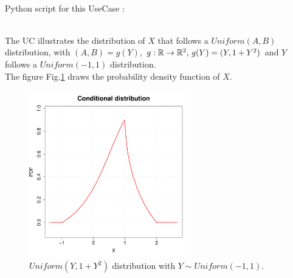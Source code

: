 \textspace\\
Python script for this UseCase :


\textspace\\

The UC illustrates the distribution of  $X$ that follows a $Uniform(A,B)$ distribution, with $(A,B)=g(Y)$, $g:{\mathbb R} \rightarrow {\mathbb R}^2, \, g(Y)=(Y, 1+Y^2)$ and $Y$ follows a $Uniform(-1, 1)$ distribution.\\
The figure Fig.\ref{ConditionalPDF} draws the probability density function of $X$.


\begin{figure}[H]
  \begin{center}
    \includegraphics[width=7cm]{Figures/pdf_conditionalDist.pdf}
    \caption{$Uniform(Y, 1+Y^2)$ distribution with $Y\sim Uniform(-1,1)$.}
    \label{ConditionalPDF}
  \end{center}
\end{figure}
